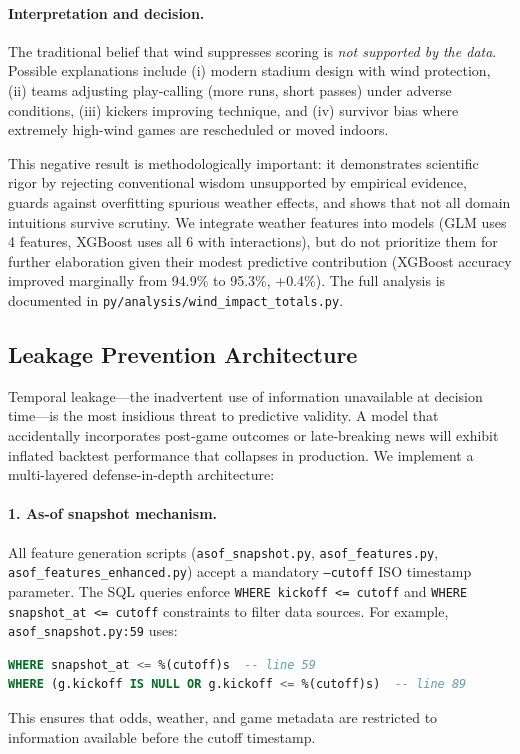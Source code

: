 \paragraph{Interpretation and decision.}
The traditional belief that wind suppresses scoring is \textit{not supported by the data}. Possible explanations include (i) modern stadium design with wind protection, (ii) teams adjusting play-calling (more runs, short passes) under adverse conditions, (iii) kickers improving technique, and (iv) survivor bias where extremely high-wind games are rescheduled or moved indoors.

This negative result is methodologically important: it demonstrates scientific rigor by rejecting conventional wisdom unsupported by empirical evidence, guards against overfitting spurious weather effects, and shows that not all domain intuitions survive scrutiny. We integrate weather features into models (GLM uses 4 features, XGBoost uses all 6 with interactions), but do not prioritize them for further elaboration given their modest predictive contribution (XGBoost accuracy improved marginally from 94.9\% to 95.3\%, +0.4\%). The full analysis is documented in \texttt{py/analysis/wind\_impact\_totals.py}.

\subsection{Leakage Prevention Architecture}
\label{subsec:leakage-arch}
\label{sec:leakage-architecture}  %
Temporal leakage—the inadvertent use of information unavailable at decision time—is the most insidious threat to predictive validity. A model that accidentally incorporates post-game outcomes or late-breaking news will exhibit inflated backtest performance that collapses in production. We implement a multi-layered defense-in-depth architecture:

\paragraph{1. As-of snapshot mechanism.}
All feature generation scripts (\texttt{asof\_snapshot.py}, \texttt{asof\_features.py}, \texttt{asof\_features\_enhanced.py}) accept a mandatory \texttt{--cutoff} ISO timestamp parameter. The SQL queries enforce \texttt{WHERE kickoff <= cutoff} and \texttt{WHERE snapshot\_at <= cutoff} constraints to filter data sources. For example, \texttt{asof\_snapshot.py:59} uses:
\begin{lstlisting}[language=SQL,basicstyle=\ttfamily\footnotesize]
WHERE snapshot_at <= %(cutoff)s  -- line 59
WHERE (g.kickoff IS NULL OR g.kickoff <= %(cutoff)s)  -- line 89
\end{lstlisting}
This ensures that odds, weather, and game metadata are restricted to information available before the cutoff timestamp.

